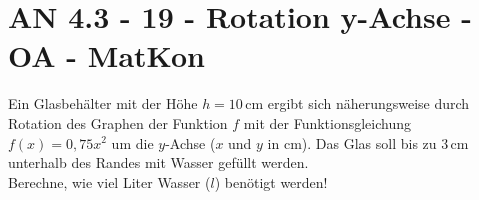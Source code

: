 \section{AN 4.3 - 19 - Rotation y-Achse - OA - MatKon}

\begin{beispiel}[AN 4.3]{1}
Ein Glasbehälter mit der Höhe $h=10$\,cm ergibt sich näherungsweise durch Rotation des Graphen der Funktion $f$ mit der Funktionsgleichung $f(x)=0,75x^2$ um die $y$-Achse ($x$ und $y$ in cm). Das Glas soll bis zu 3\,cm unterhalb des Randes mit Wasser gefüllt werden.\\
Berechne, wie viel Liter Wasser ($l$) benötigt werden!

\end{beispiel}